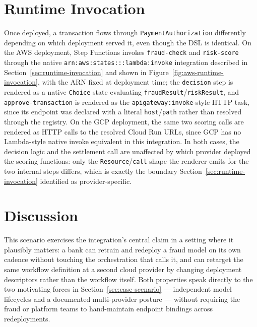\section{Runtime Invocation}
\label{sec:case-runtime}

Once deployed, a transaction flows through \texttt{PaymentAuthorization} differently depending on
which deployment served it, even though the DSL is identical. On the AWS deployment, Step
Functions invokes \texttt{fraud-check} and \texttt{risk-score} through the native
\texttt{arn:aws:states:::lambda:invoke} integration described in Section~\ref{sec:runtime-invocation}
and shown in Figure~\ref{fig:aws-runtime-invocation}, with the ARN fixed at deployment time; the
\texttt{decision} step is rendered as a native \texttt{Choice} state evaluating
\texttt{fraudResult}/\texttt{riskResult}, and \texttt{approve-transaction} is rendered as the
\texttt{apigateway:invoke}-style HTTP task, since its endpoint was declared with a literal
\texttt{host}/\texttt{path} rather than resolved through the registry. On the GCP deployment, the
same two scoring calls are rendered as HTTP calls to the resolved Cloud Run URLs, since GCP has no
Lambda-style native invoke equivalent in this integration. In both cases, the decision logic and
the settlement call are unaffected by which provider deployed the scoring functions: only the
\texttt{Resource}/\texttt{call} shape the renderer emits for the two internal steps differs, which
is exactly the boundary Section~\ref{sec:runtime-invocation} identified as provider-specific.

\section{Discussion}
\label{sec:case-discussion}

This scenario exercises the integration's central claim in a setting where it plausibly matters:
a bank can retrain and redeploy a fraud model on its own cadence without touching the
orchestration that calls it, and can retarget the same workflow definition at a second cloud
provider by changing deployment descriptors rather than the workflow itself. Both properties speak
directly to the two motivating forces in Section~\ref{sec:case-scenario} --- independent model
lifecycles and a documented multi-provider posture --- without requiring the fraud or platform
teams to hand-maintain endpoint bindings across redeployments.

